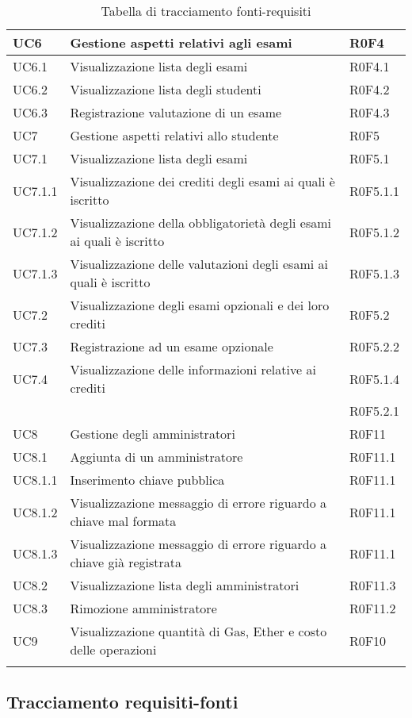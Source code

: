 \documentclass[AnalisiDeiRequisiti.tex]{subfiles}
\begin{document}
\begin{longtable}[H]{|p{2cm}|p{5cm}|p{5cm}|}
	UC6 & Gestione aspetti relativi agli esami & R0F4 \\ \hline
	UC6.1 & Visualizzazione lista degli esami & R0F4.1 \\ \hline
	UC6.2 & Visualizzazione lista degli studenti & R0F4.2  \\ \hline
	UC6.3 & Registrazione valutazione di un esame & R0F4.3 \\ \hline
	UC7 & Gestione aspetti relativi allo studente & R0F5 \\ \hline
	UC7.1 & Visualizzazione lista degli esami & R0F5.1 \\ \hline
	UC7.1.1 & Visualizzazione dei crediti degli esami ai quali è iscritto & R0F5.1.1 \\ \hline
	UC7.1.2 & Visualizzazione della obbligatorietà degli esami ai quali è iscritto & R0F5.1.2 \\ \hline
	UC7.1.3 & Visualizzazione delle valutazioni degli esami ai quali è iscritto	& R0F5.1.3 \\ \hline
	UC7.2 & Visualizzazione degli esami opzionali e dei loro crediti & R0F5.2 \\ \hline
	UC7.3 & Registrazione ad un esame opzionale & R0F5.2.2 \\ \hline
	UC7.4 & Visualizzazione delle informazioni relative ai crediti & R0F5.1.4 \\ 
	& & R0F5.2.1 \\ \hline
	UC8 & Gestione degli amministratori & R0F11 \\ \hline
	UC8.1 & Aggiunta di un amministratore & R0F11.1 \\ \hline
	UC8.1.1 & Inserimento chiave pubblica & R0F11.1 \\ \hline
	UC8.1.2 & Visualizzazione messaggio di errore riguardo a chiave mal formata & R0F11.1 \\ \hline
	UC8.1.3 & Visualizzazione messaggio di errore riguardo a chiave già registrata & R0F11.1 \\ \hline
	UC8.2 & Visualizzazione lista degli amministratori & R0F11.3 \\ \hline
	UC8.3 & Rimozione amministratore & R0F11.2 \\ \hline
	UC9 & Visualizzazione quantità di Gas, Ether e costo delle operazioni & R0F10 \\ \hline

	\caption{Tabella di tracciamento fonti-requisiti}
\end{longtable}

\subsection{Tracciamento requisiti-fonti}
\end{document}

